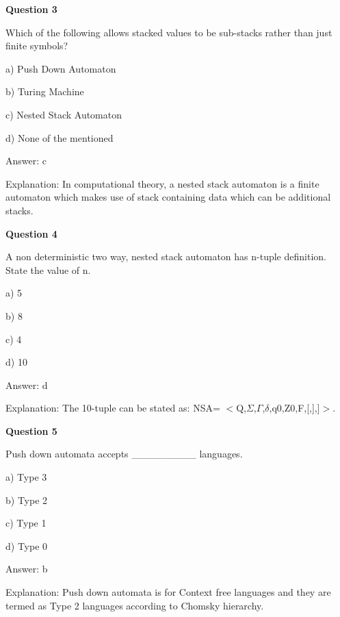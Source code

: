 \documentclass{article}
\begin{document}
\begin{mdframed}[linewidth=1pt, roundcorner=5pt, linecolor=gray!30, backgroundcolor=gray!5]
\textbf{Question 3} 

Which of the following allows stacked values to be sub-stacks rather than just finite symbols?

a) Push Down Automaton

b) Turing Machine

c) Nested Stack Automaton

d) None of the mentioned
\vspace{5pt} \par
\begin{tcolorbox}[colback=green!5, colframe=green!40!black, title=Solution]
Answer: c

Explanation: In computational theory, a nested stack automaton is a finite automaton which makes use of stack containing data which can be additional stacks.
\end{tcolorbox}
\end{mdframed}
\newpage

\begin{mdframed}[linewidth=1pt, roundcorner=5pt, linecolor=gray!30, backgroundcolor=gray!5]
\textbf{Question 4} 

A non deterministic two way, nested stack automaton has n-tuple definition. State the value of n.

a) 5

b) 8

c) 4

d) 10
\vspace{5pt} \par
\begin{tcolorbox}[colback=green!5, colframe=green!40!black, title=Solution]
Answer: d

Explanation: The 10-tuple can be stated as: NSA=  $<$Q,$\Sigma$,$\Gamma$,$\delta$,q0,Z0,F,[,],]$>$.
\end{tcolorbox}
\end{mdframed}

\begin{mdframed}[linewidth=1pt, roundcorner=5pt, linecolor=gray!30, backgroundcolor=gray!5]
\textbf{Question 5} 

Push down automata accepts \_\_\_\_\_\_\_\_\_ languages.

a) Type 3

b) Type 2

c) Type 1

d) Type 0
\vspace{5pt} \par
\begin{tcolorbox}[colback=green!5, colframe=green!40!black, title=Solution]
Answer: b

Explanation: Push down automata is for Context free languages and they are termed as Type 2 languages according to Chomsky hierarchy.
\end{tcolorbox}
\end{mdframed}
\end{document}
